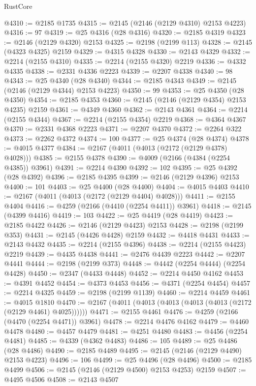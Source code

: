 \begin{lexlean}{RustCore}
\begin{coremodule}
@4310 := @2185 @1735
@4315 := @2145 (@2146 (@2129 @4310) @2153 @4223)
@4316 := 97
@4319 := @25 @4316 (@28 @4316)
@4320 := @2185 @4319
@4323 := @2146 (@2129 @4320) @2153
@4325 := @2198 (@2199 @113)
@4328 := @2145 (@4323 @4325) @2159
@4329 := @4315 @4328
@4330 := @2143 @4329
@4332 := @2214 (@2155 @4310)
@4335 := @2214 (@2155 @4320) @2219
@4336 := @4332 @4335
@4338 := @2331 @4336 @2223
@4339 := @2207 @4338
@4340 := 98
@4343 := @25 @4340 (@28 @4340)
@4344 := @2185 @4343
@4349 := @2145 (@2146 (@2129 @4344) @2153 @4223)
@4350 := 99
@4353 := @25 @4350 (@28 @4350)
@4354 := @2185 @4353
@4360 := @2145 (@2146 (@2129 @4354) @2153 @4235) @2159
@4361 := @4349 @4360
@4362 := @2143 @4361
@4364 := @2214 (@2155 @4344)
@4367 := @2214 (@2155 @4354) @2219
@4368 := @4364 @4367
@4370 := @2331 @4368 @2223
@4371 := @2207 @4370
@4372 := @2264 @322
@4373 := @2262 @4372
@4374 := 100
@4377 := @25 @4374 (@28 @4374)
@4378 := @4015 @4377
@4384 := @2167 (@4011 (@4013 (@2172 (@2129 @4378) @4028)))
@4385 := @2155 @4378
@4390 := @4009 (@2166 (@4384 (@2254 @4385)) @3961)
@4391 := @2214 @4390
@4392 := 102
@4395 := @25 @4392 (@28 @4392)
@4396 := @2185 @4395
@4399 := @2146 (@2129 @4396) @2153
@4400 := 101
@4403 := @25 @4400 (@28 @4400)
@4404 := @4015 @4403
@4410 := @2167 (@4011 (@4013 (@2172 (@2129 @4404) @4028)))
@4411 := @2155 @4404
@4416 := @4259 (@2166 (@4410 (@2254 @4411)) @3961)
@4418 := @2145 (@4399 @4416)
@4419 := 103
@4422 := @25 @4419 (@28 @4419)
@4423 := @2185 @4422
@4426 := @2146 (@2129 @4423) @2153
@4428 := @2198 (@2199 @353)
@4431 := @2145 (@4426 @4428) @2159
@4432 := @4418 @4431
@4433 := @2143 @4432
@4435 := @2214 (@2155 @4396)
@4438 := @2214 (@2155 @4423) @2219
@4439 := @4435 @4438
@4441 := @2476 @4439 @2223
@4442 := @2207 @4441
@4444 := @2198 (@2199 @373)
@4448 := @4442 (@2254 @4444) (@2254 @4428)
@4450 := @2347 (@4433 @4448)
@4452 := @2214 @4450 @4162
@4453 := @4391 @4452
@4454 := @4373 @4453
@4456 := @4371 (@2254 @4454)
@4457 := @2214 @4325
@4459 := @2198 (@2199 @1139)
@4460 := @2214 @4459
@4461 := @4015 @1810
@4470 := @2167 (@4011 (@4013 (@4013 (@4013 (@4013 (@2172 (@2129 @4461) @4025))))))
@4471 := @2155 @4461
@4476 := @4259 (@2166 (@4470 (@2254 @4471)) @3961)
@4478 := @2214 @4476 @4162
@4479 := @4460 @4478
@4480 := @4457 @4479
@4481 := @4251 @4480
@4483 := @4456 (@2254 @4481)
@4485 := @4339 (@4362 @4483)
@4486 := 105
@4489 := @25 @4486 (@28 @4486)
@4490 := @2185 @4489
@4495 := @2145 (@2146 (@2129 @4490) @2153 @4223)
@4496 := 106
@4499 := @25 @4496 (@28 @4496)
@4500 := @2185 @4499
@4506 := @2145 (@2146 (@2129 @4500) @2153 @4253) @2159
@4507 := @4495 @4506
@4508 := @2143 @4507

\end{coremodule}
\end{lexlean}

